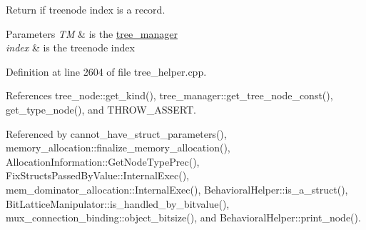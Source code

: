 Return if treenode index is a record. 


\begin{DoxyParams}{Parameters}
{\em TM} & is the \hyperlink{classtree__manager}{tree\+\_\+manager} \\
\hline
{\em index} & is the treenode index \\
\hline
\end{DoxyParams}


Definition at line 2604 of file tree\+\_\+helper.\+cpp.



References tree\+\_\+node\+::get\+\_\+kind(), tree\+\_\+manager\+::get\+\_\+tree\+\_\+node\+\_\+const(), get\+\_\+type\+\_\+node(), and T\+H\+R\+O\+W\+\_\+\+A\+S\+S\+E\+RT.



Referenced by cannot\+\_\+have\+\_\+struct\+\_\+parameters(), memory\+\_\+allocation\+::finalize\+\_\+memory\+\_\+allocation(), Allocation\+Information\+::\+Get\+Node\+Type\+Prec(), Fix\+Structs\+Passed\+By\+Value\+::\+Internal\+Exec(), mem\+\_\+dominator\+\_\+allocation\+::\+Internal\+Exec(), Behavioral\+Helper\+::is\+\_\+a\+\_\+struct(), Bit\+Lattice\+Manipulator\+::is\+\_\+handled\+\_\+by\+\_\+bitvalue(), mux\+\_\+connection\+\_\+binding\+::object\+\_\+bitsize(), and Behavioral\+Helper\+::print\+\_\+node().

